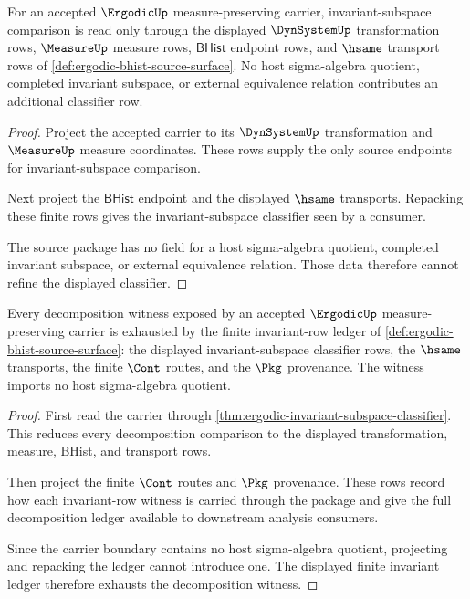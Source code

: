 \begin{theorem}
\label{thm:ergodic-invariant-subspace-classifier}
For an accepted $\ErgodicUp$ measure-preserving carrier, invariant-subspace
comparison is read only through the displayed $\DynSystemUp$ transformation
rows, $\MeasureUp$ measure rows, $\mathsf{BHist}$ endpoint rows, and $\hsame$
transport rows of \autoref{def:ergodic-bhist-source-surface}. No host
sigma-algebra quotient, completed invariant subspace, or external equivalence
relation contributes an additional classifier row.
\end{theorem}
\begin{proof}
Project the accepted carrier to its $\DynSystemUp$ transformation and
$\MeasureUp$ measure coordinates. These rows supply the only source endpoints
for invariant-subspace comparison.

Next project the $\mathsf{BHist}$ endpoint and the displayed $\hsame$
transports. Repacking these finite rows gives the invariant-subspace classifier
seen by a consumer.

The source package has no field for a host sigma-algebra quotient, completed
invariant subspace, or external equivalence relation. Those data therefore
cannot refine the displayed classifier.
\end{proof}

\begin{theorem}
\label{thm:ergodic-decomposition-ledger}
Every decomposition witness exposed by an accepted $\ErgodicUp$
measure-preserving carrier is exhausted by the finite invariant-row ledger of
\autoref{def:ergodic-bhist-source-surface}: the displayed invariant-subspace
classifier rows, the $\hsame$ transports, the finite $\Cont$ routes, and the
$\Pkg$ provenance. The witness imports no host sigma-algebra quotient.
\end{theorem}
\begin{proof}
First read the carrier through
\autoref{thm:ergodic-invariant-subspace-classifier}. This reduces every
decomposition comparison to the displayed transformation, measure, BHist, and
transport rows.

Then project the finite $\Cont$ routes and $\Pkg$ provenance. These rows record
how each invariant-row witness is carried through the package and give the full
decomposition ledger available to downstream analysis consumers.

Since the carrier boundary contains no host sigma-algebra quotient, projecting
and repacking the ledger cannot introduce one. The displayed finite invariant
ledger therefore exhausts the decomposition witness.
\end{proof}

